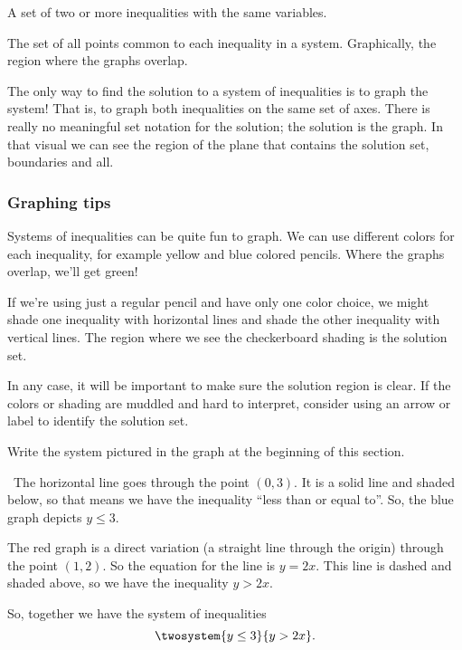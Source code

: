 \begin{boxdef}
A set of two or more inequalities with the same variables.
\end{boxdef}

\begin{boxdef}
The set of all points common to each inequality in a system. Graphically, the region where the graphs overlap.
\end{boxdef}

The only way to find the solution to a system of inequalities is to graph the system! That is, to graph both inequalities on the same set of axes. There is really no meaningful set notation for the solution; the solution is the graph. In that visual we can see the region of the plane that contains the solution set, boundaries and all.

\subsubsection{Graphing tips}

Systems of inequalities can be quite fun to graph. We can use different colors for each inequality, for example yellow and blue colored pencils. Where the graphs overlap, we'll get green!

If we're using just a regular pencil and have only one color choice, we might shade one inequality with horizontal lines and shade the other inequality with vertical lines. The region where we see the checkerboard shading is the solution set.

In any case, it will be important to make sure the solution region is clear. If the colors or shading are muddled and hard to interpret, consider using an arrow or label to identify the solution set.

\begin{boxex}
Write the system pictured in the graph at the beginning of this section.

\exsoln\ The horizontal line goes through the point $(0,3)$. It is a solid line and shaded below, so that means we have the inequality ``less than or equal to''. So, the blue graph depicts $y \leq 3$.

The red graph is a direct variation (a straight line through the origin) through the point $(1,2)$. So the equation for the line is $y=2x$. This line is dashed and shaded above, so we have the inequality $y > 2x$.

So, together we have the system of inequalities \[\twosystem{y\leq3}{y>2x}.\]
\end{boxex}

